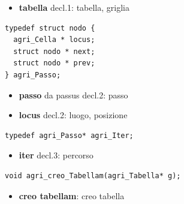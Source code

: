 \documentclass[8pt]{book}
\begin{document}
\begin{itemize}
\item
  \textbf{tabella} decl.1: tabella, griglia
\end{itemize}

\begin{spacing}{0.9}
  \begin{small}
    \begin{tcolorbox}
\begin{verbatim}
typedef struct nodo {
  agri_Cella * locus;
  struct nodo * next;
  struct nodo * prev;
} agri_Passo;
\end{verbatim}
  \end{tcolorbox}
    \end{small}
      \end{spacing}

\begin{itemize}

\item
  \textbf{passo} da passus decl.2: passo
\item
  \textbf{locus} decl.2: luogo, posizione
\end{itemize}

\begin{spacing}{0.9}
  \begin{small}
    \begin{tcolorbox}
\begin{verbatim}
typedef agri_Passo* agri_Iter;
\end{verbatim}
  \end{tcolorbox}
    \end{small}
      \end{spacing}

\begin{itemize}

\item
  \textbf{iter} decl.3: percorso
\end{itemize}

\begin{spacing}{0.9}
  \begin{small}
    \begin{tcolorbox}
\begin{verbatim}
void agri_creo_Tabellam(agri_Tabella* g);
\end{verbatim}
  \end{tcolorbox}
    \end{small}
      \end{spacing}

\begin{itemize}
\item
  \textbf{creo tabellam}: creo tabella
\end{itemize}
\end{document}
